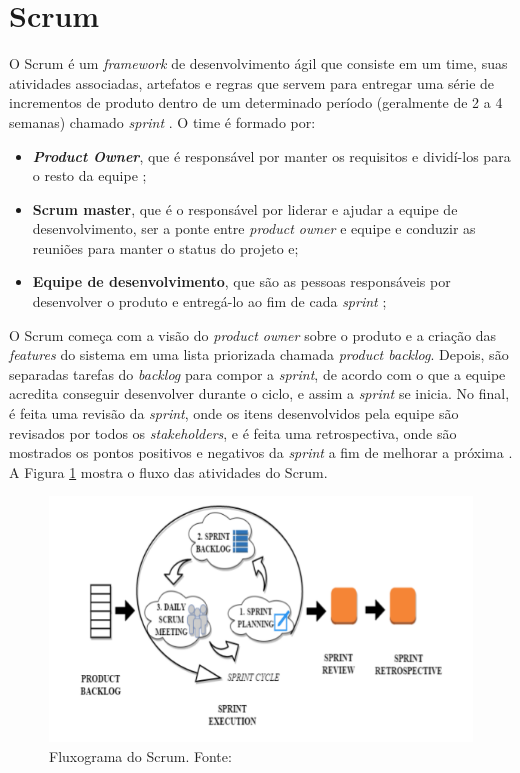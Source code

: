 \section{Scrum}

O Scrum é um \textit{framework} de desenvolvimento ágil que consiste em um time, suas atividades associadas, artefatos e regras que servem para entregar uma série de incrementos de produto dentro de um determinado período (geralmente de 2 a 4 semanas) chamado \textit{sprint} \cite{livro-scrum}.
O time é formado por:
\begin{itemize}
\item \textbf{\textit{Product Owner}}, que é responsável por manter os requisitos e dividí-los para o resto da equipe \cite{product-owner};
\item \textbf{Scrum master}, que é o responsável por liderar e ajudar a equipe de desenvolvimento, ser a ponte entre \textit{product owner} e equipe e conduzir as reuniões para manter o status do projeto \cite{scrum-master} e;
\item \textbf{Equipe de desenvolvimento}, que são as pessoas responsáveis por desenvolver o produto e entregá-lo ao fim de cada \textit{sprint} \cite{equipe-dev};
\end{itemize}
O Scrum começa com a visão do \textit{product owner} sobre o produto e a criação das \textit{features} do sistema em uma lista priorizada chamada \textit{product backlog}. Depois, são separadas tarefas do \textit{backlog} para compor a \textit{sprint}, de acordo com o que a equipe acredita conseguir desenvolver durante o ciclo, e assim a \textit{sprint} se inicia. No final, é feita uma revisão da \textit{sprint}, onde os itens desenvolvidos pela equipe são revisados por todos os \textit{stakeholders}, e é feita uma retrospectiva, onde são mostrados os pontos positivos e negativos da \textit{sprint} a fim de melhorar a próxima \cite{livro-scrum}. A Figura \ref{img:scrum} mostra o fluxo das atividades do Scrum.

\begin{figure}[H]
    \centering
    \includegraphics[scale=0.5]{figuras/scrum.png}
    \caption[Fluxograma do Scrum]{Fluxograma do Scrum. Fonte: \cite{artigo-scrum}}
    \label{img:scrum}
\end{figure}
